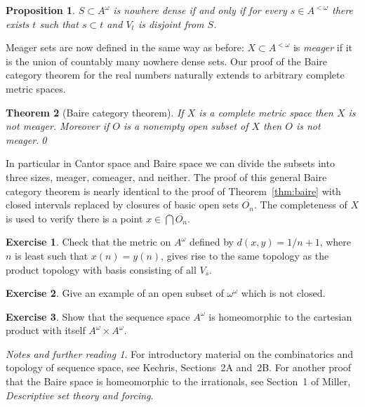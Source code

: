 \documentclass[11pt,oneside]{amsbook}
\theoremstyle{definition}
\newtheorem{exercise}{Exercise}[section]
\theoremstyle{plain}
\newtheorem{theorem}{Theorem}[section]
\newtheorem{proposition}[theorem]{Proposition}
\theoremstyle{definition}
\theoremstyle{remark}
\newtheorem*{notes}{Notes and further reading}
\numberwithin{equation}{section}
\numberwithin{figure}{section}
\begin{document}
\begin{proposition}
  \label{prop:cantor-space-nwd}
  $S\subset A^\omega$ is nowhere dense if and only if for every $s\in A^{<\omega}$ there exists $t$ such that $s\subset t$ and $V_t$ is disjoint from $S$.
\end{proposition}

Meager sets are now defined in the same way as before: $X\subset A^{<\omega}$ is \emph{meager} if it is the union of countably many nowhere dense sets. Our proof of the Baire category theorem for the real numbers naturally extends to arbitrary complete metric spaces.

\begin{theorem}[Baire category theorem]
  If $X$ is a complete metric space then $X$ is not meager. Moreover if $O$ is a nonempty open subset of $X$ then $O$ is not meager.\qed
\end{theorem}

In particular in Cantor space and Baire space we can divide the subsets into three sizes, meager, comeager, and neither. The proof of this general Baire category theorem is nearly identical to the proof of Theorem~\ref{thm:baire} with closed intervals replaced by closures of basic open sets $\overline{O_n}$. The completeness of $X$ is used to verify there is a point $x\in\bigcap\overline{O_n}$.


\begin{exercise}
  Check that the metric on $A^\omega$ defined by $d(x,y)=1/{n+1}$, where $n$ is least such that $x(n)=y(n)$, gives rise to the same topology as the product topology with basis consisting of all $V_s$.
\end{exercise}

\begin{exercise}
  Give an example of an open subset of $\omega^\omega$ which is not closed.
\end{exercise}

\begin{exercise}
  Show that the sequence space $A^\omega$ is homeomorphic to the cartesian product with itself $A^\omega\times A^\omega$.
\end{exercise}

\begin{notes}
  For introductory material on the combinatorics and topology of sequence space, see Kechris, Sections~2A and~2B. For another proof that the Baire space is homeomorphic to the irrationals, see Section~1 of Miller, \emph{Descriptive set theory and forcing}.
\end{notes}
\end{document}
